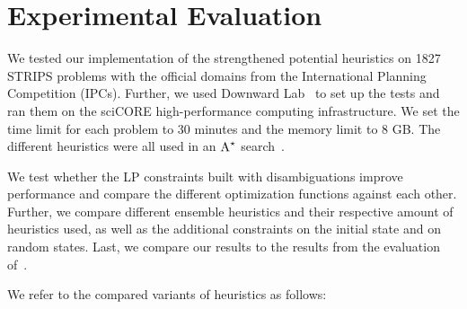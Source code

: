\chapter{Experimental Evaluation}\label{ch:evaluation}

We tested our implementation of the strengthened potential heuristics on 1827 STRIPS problems with the official domains from the International Planning Competition (IPCs).
Further, we used Downward Lab~\citep{seipp-et-al-zenodo2017} to set up the tests and ran them on the sciCORE high-performance computing infrastructure.
We set the time limit for each problem to 30 minutes and the memory limit to 8 GB.
The different heuristics were all used in an $\textup{A}^{\star}$ search~\citep{hart1968formal}.

We test whether the LP constraints built with disambiguations improve performance and compare the different optimization functions against each other.
Further, we compare different ensemble heuristics and their respective amount of heuristics used, as well as the additional constraints on the initial state and on random states.
Last, we compare our results to the results from the evaluation of~\cite{fivser2020strengthening}.

We refer to the compared variants of heuristics as follows:

